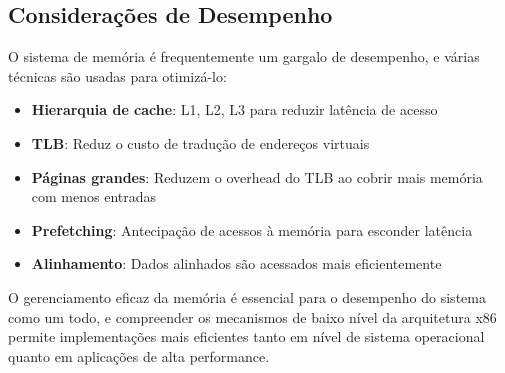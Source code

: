 \subsection{Considerações de Desempenho}
\label{subsec:desempenho}

O sistema de memória é frequentemente um gargalo de desempenho, e várias técnicas são usadas para otimizá-lo:

\begin{itemize}
    \item \textbf{Hierarquia de cache}: L1, L2, L3 para reduzir latência de acesso

    \item \textbf{TLB}: Reduz o custo de tradução de endereços virtuais

    \item \textbf{Páginas grandes}: Reduzem o overhead do TLB ao cobrir mais memória com menos entradas

    \item \textbf{Prefetching}: Antecipação de acessos à memória para esconder latência

    \item \textbf{Alinhamento}: Dados alinhados são acessados mais eficientemente
\end{itemize}

O gerenciamento eficaz da memória é essencial para o desempenho do sistema como um todo, e compreender os mecanismos de baixo nível da arquitetura x86 permite implementações mais eficientes tanto em nível de sistema operacional quanto em aplicações de alta performance.
